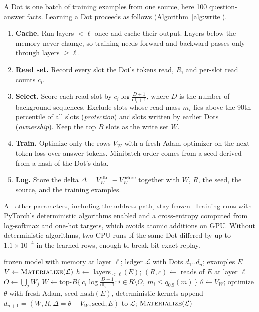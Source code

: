 \documentclass[10pt]{article}
\begin{document}
A Dot is one batch of training examples from one source, here 100 question-answer facts. Learning a Dot proceeds as follows (Algorithm~\ref{alg:write}).

\begin{enumerate}
  \item \textbf{Cache.} Run layers $<\ell$ once and cache their output. Layers below the memory never change, so training needs forward and backward passes only through layers $\geq\ell$.
  \item \textbf{Read set.} Record every slot the Dot's tokens read, $R$, and per-slot read counts $c_i$.
  \item \textbf{Select.} Score each read slot by $c_i \log\frac{D+1}{\mathrm{df}_i+1}$, where $D$ is the number of background sequences. Exclude slots whose read mass $m_i$ lies above the 90th percentile of all slots (\emph{protection}) and slots written by earlier Dots (\emph{ownership}). Keep the top $B$ slots as the write set $W$.
  \item \textbf{Train.} Optimize only the rows $V_W$ with a fresh Adam optimizer \citep{kingma2015adam} on the next-token loss over answer tokens. Minibatch order comes from a seed derived from a hash of the Dot's data.
  \item \textbf{Log.} Store the delta $\Delta = V_W^{\text{after}} - V_W^{\text{before}}$ together with $W$, $R$, the seed, the source, and the training examples.
\end{enumerate}

All other parameters, including the address path, stay frozen. Training runs with PyTorch's deterministic algorithms enabled \citep{pytorchrepro} and a cross-entropy computed from log-softmax and one-hot targets, which avoids atomic additions on GPU. Without deterministic algorithms, two CPU runs of the same Dot differed by up to $1.1\times10^{-4}$ in the learned rows, enough to break bit-exact replay.

\begin{algorithm}[t]
\caption{Learning a Dot and recording it in the ledger}
\label{alg:write}
\begin{algorithmic}[1]
\Require frozen model with memory at layer $\ell$; ledger $\mathcal{L}$ with Dots $d_1..d_n$; examples $E$
\State $V \gets \textsc{Materialize}(\mathcal{L})$ 
\State $h \gets$ layers$_{<\ell}(E)$; \; $(R, c) \gets$ reads of $E$ at layer $\ell$
\State $O \gets \bigcup_j W_j$ 
\State $W \gets \mathrm{top}\text{-}B\{\, c_i \log\frac{D+1}{\mathrm{df}_i+1} : i \in R \setminus O,\ m_i \le q_{0.9}(m) \,\}$
\State $\theta \gets V_W$; optimize $\theta$ with fresh Adam, seed $\mathrm{hash}(E)$, deterministic kernels
\State append $d_{n+1} = (W, R, \Delta = \theta - V_W, \mathrm{seed}, E)$ to $\mathcal{L}$; \Return $\textsc{Materialize}(\mathcal{L})$
\end{algorithmic}
\end{algorithm}
\end{document}
